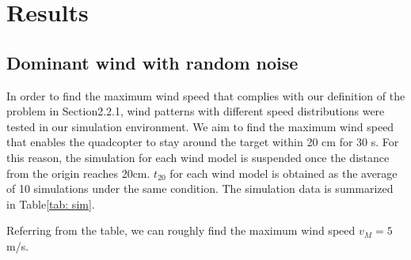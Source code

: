 \section{Results}
\subsection{Dominant wind with random noise}
In order to find the maximum wind speed that complies with our definition of the problem in Section2.2.1, wind patterns with different speed distributions were tested in our simulation environment. We aim to find the maximum wind speed that enables the quadcopter to stay around the target within 20 cm for 30 s. For this reason, the simulation for each wind model is suspended once the distance from the origin reaches 20cm. $t_20$ for each wind model is obtained as the average of 10 simulations under the same condition. The simulation data is summarized in Table\ref{tab: sim}.

Referring from the table, we can roughly find the maximum wind speed $v_M = 5$ m/s.

